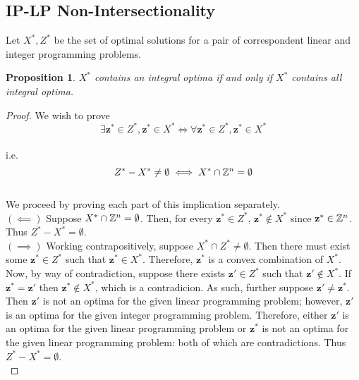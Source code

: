 \documentclass[conference]{IEEEtran}
\numberwithin{equation}{section}
\numberwithin{figure}{section}
\theoremstyle{plain}
\newtheorem{prop}[equation]{Proposition}
\theoremstyle{definition}
\newcommand{\Z}{\ensuremath \mathbb{Z}}
\newcommand{\1}{\ensuremath \mathbbm{1}}
\begin{document}
\subsection{IP-LP Non-Intersectionality}
Let $X^*,Z^*$ be the set of optimal solutions for a pair of correspondent linear 
and integer programming problems. \\
\begin{prop}
$X^*$ contains an integral optima if and only if $X^*$ contains all integral 
optima. \\
\end{prop}
\begin{proof}
We wish to prove \\
\[\exists \mathbf{z}^* \in Z^*, \mathbf{z}^* \in X^* \iff \forall \mathbf{z}^* 
\in Z^*, \mathbf{z}^* \in X^*\] \\
i.e. \\
\[Z^* - X^* \neq \emptyset \iff X^* \cap \Z^n = \emptyset\] \\
We proceed by proving each part of this implication separately. \\ \hfill \break
$(\impliedby)$ Suppose $X^* \cap \Z^n = \emptyset$. Then, for every $\mathbf{z}^* 
\in Z^*$, $\mathbf{z}^* \not \in X^*$ since $\mathbf{z}^* \in \Z^n$. Thus 
$Z^* - X^* = \emptyset$. \\ \hfill \break
$(\implies)$ Working contrapositively, suppose $X^* \cap Z^* \neq \emptyset$. 
Then there must exist some $\mathbf{z}^* \in Z^*$ such that $\mathbf{z}^* \in 
X^*$. Therefore, $\mathbf{z}^*$ is a convex combination of $X^*$. Now, by way of 
contradiction, suppose there exists $\mathbf{z}' \in Z^*$ such that $\mathbf{z}' 
\not \in X^*$. If $\mathbf{z}^* = \mathbf{z}'$ then $\mathbf{z}^* \not \in X^*$,
which is a contradicion. As such, further suppose $\mathbf{z}' \neq 
\mathbf{z}^*$. Then $\mathbf{z}'$ is not an optima for the given linear 
programming problem; however, $\mathbf{z}'$ is an optima for the given integer 
programming problem. Therefore, either $\mathbf{z}'$ is an optima for the given 
linear programming problem or $\mathbf{z}^*$ is not an optima for the given 
linear programming problem: both of which are contradictions. Thus $Z^* - X^* = 
\emptyset$. \\
\end{proof}
\end{document}
